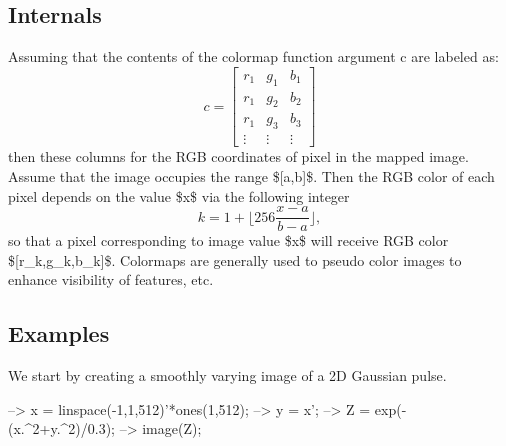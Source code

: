 \hypertarget{transforms_svd_Function}{}\subsection{Internals}\label{transforms_svd_Function}
Assuming that the contents of the colormap function argument {\ttfamily c} are labeled as\-: \[ c = \begin{bmatrix} r_1 & g_1 & b_1 \\ r_1 & g_2 & b_2 \\ r_1 & g_3 & b_3 \\ \vdots & \vdots & \vdots \end{bmatrix} \] then these columns for the R\-G\-B coordinates of pixel in the mapped image. Assume that the image occupies the range \$\mbox{[}a,b\mbox{]}\$. Then the R\-G\-B color of each pixel depends on the value \$x\$ via the following integer \[ k = 1 + \lfloor 256 \frac{x-a}{b-a} \rfloor, \] so that a pixel corresponding to image value \$x\$ will receive R\-G\-B color \$\mbox{[}r\-\_\-k,g\-\_\-k,b\-\_\-k\mbox{]}\$. Colormaps are generally used to pseudo color images to enhance visibility of features, etc. \hypertarget{variables_matrix_Examples}{}\subsection{Examples}\label{variables_matrix_Examples}
We start by creating a smoothly varying image of a 2\-D Gaussian pulse.


\begin{DoxyVerbInclude}
--> x = linspace(-1,1,512)'*ones(1,512);
--> y = x';
--> Z = exp(-(x.^2+y.^2)/0.3);
--> image(Z);
\end{DoxyVerbInclude}


